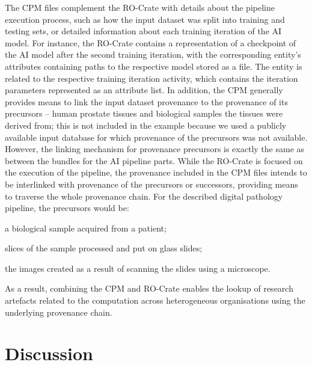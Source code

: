 The CPM files complement the RO-Crate with details about the pipeline execution process, such as how the input dataset was split into training and testing sets, or detailed information about each training iteration of the AI model.
For instance, the RO-Crate contains a representation of a checkpoint of the AI model after the second training iteration, with the corresponding entity's attributes containing paths to the respective model stored as a file.
The entity is related to the respective training iteration activity, which contains the iteration parameters represented as an attribute list.
In addition, the CPM generally provides means to link the input dataset provenance to the provenance of its precursors -- human prostate tissues and biological samples the tissues were derived from; this is not included in the example because we used a publicly available input database for which provenance of the precursors was not available.
However, the linking mechanism for provenance precursors is exactly the same as between the bundles for the AI pipeline parts.
While the RO-Crate is focused on the execution of the pipeline, the provenance included in the CPM files intends to be interlinked with provenance of the precursors or successors, providing means to traverse the whole provenance chain.
For the described digital pathology pipeline, the precursors would be:
\begin{inlineenum}
\item a biological sample acquired from a patient;
\item slices of the sample processed and put on glass slides;
\item the images created as a result of scanning the slides using a microscope.
\end{inlineenum}
As a result, combining the CPM and RO-Crate enables the lookup of research artefacts related to the computation across heterogeneous organisations using the underlying provenance chain.


%
\section{Discussion}\label{wrroc:discussion}


